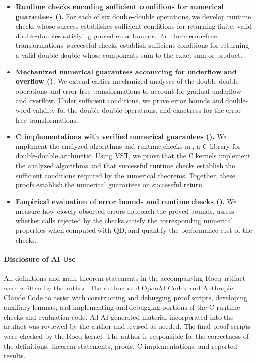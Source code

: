 \begin{itemize}
  \item \textbf{Runtime checks encoding sufficient conditions for
  numerical guarantees ().}
  For each of six double-double operations, we develop runtime checks whose
  success establishes sufficient conditions for returning finite, valid
  double-doubles satisfying proved error bounds. For three error-free
  transformations, successful checks establish sufficient conditions for
  returning a valid double-double whose components sum to the exact sum
  or product.

  \item \textbf{Mechanized numerical guarantees accounting for
  underflow and overflow ().}
  We extend earlier mechanized analyses of the double-double operations
  and error-free transformations to account for gradual underflow and
  overflow. Under sufficient conditions, we prove error bounds and 
  double-word validity for the double-double operations, and exactness for the 
  error-free transformations.

  \item \textbf{C implementations with verified numerical guarantees
  ().}
  We implement the analyzed algorithms and runtime checks in \FenceDD{},
  a C library for double-double arithmetic. Using VST, we prove that the
  C kernels implement the analyzed algorithms and that successful runtime
  checks establish the sufficient conditions required by the numerical
  theorems. Together, these proofs establish the numerical guarantees on
  successful return.

  \item \textbf{Empirical evaluation of error bounds and runtime checks
  ().}
  We measure how closely observed errors approach the proved bounds,
  assess whether calls rejected by the checks satisfy the corresponding
  numerical properties when computed with QD, and quantify the
  performance cost of the checks.
\end{itemize}

\paragraph{Disclosure of AI Use}
All definitions and main theorem statements in the accompanying Rocq
artifact were written by the author. The author used OpenAI Codex
and Anthropic Claude Code to assist with constructing and debugging
proof scripts, developing auxiliary lemmas, and implementing and
debugging portions of the C runtime checks and evaluation code.
All AI-generated material incorporated into the artifact was reviewed
by the author and revised as needed. The final proof scripts were
checked by the Rocq kernel. The author is responsible for
the correctness of the definitions, theorem statements, proofs,
C implementations, and reported results.
